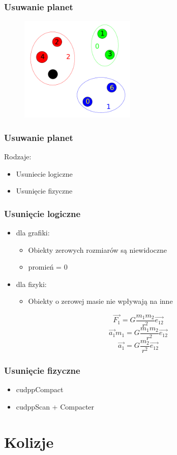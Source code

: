 \documentclass{beamer}
\begin{document}
\frame
{
	\frametitle{Usuwanie planet}
	\begin{figure}
		\centering
		\includegraphics[height=5cm]{img/clusters2.pdf}
	\end{figure}
	\setcounter{subfigure}{0}
}

\frame
{
	\frametitle{Usuwanie planet}
	Rodzaje:
	\begin{itemize}
	\item Usuniecie logiczne
	\item Usunięcie fizyczne
	\end{itemize}
}

\frame
{
	\frametitle{Usunięcie logiczne}
	\begin{itemize}
		\item dla grafiki:
		\begin{itemize}
			\item{Obiekty zerowych rozmiarów są niewidoczne}
			\item{promień = 0}
		\end{itemize}
		\item dla fizyki:
		\begin{itemize}
			\item{Obiekty o zerowej masie nie wpływają na inne}
		\end{itemize}
		\hspace{0.6cm}
		$$ \overrightarrow{F_1} = G\frac{m_1 m_2}{r^2}\overrightarrow{e_{12}}  $$
		$$ \overrightarrow{a_1}m_1 = G\frac{m_1 m_2}{r^2}\overrightarrow{e_{12}}  $$
		$$ \overrightarrow{a_1} = G\frac{m_2}{r^2}\overrightarrow{e_{12}}  $$
	\end{itemize}
}

\frame
{
	\frametitle{Usunięcie fizyczne}
	\begin{itemize}
	\item{cudppCompact}
	\item{cudppScan + Compacter}
	\end{itemize}
}

\section{Kolizje}
\end{document}
